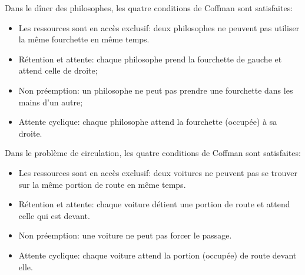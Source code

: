 \documentclass[a4paper,11pt]{article}
\begin{document}
\begin{Form}
\noindent Dans le dîner des philosophes, les quatre conditions de Coffman sont satisfaites:
\begin{itemize}
\item Les ressources sont en accès exclusif: deux philosophes ne peuvent pas utiliser la même fourchette en même temps.
\item Rétention et attente: chaque philosophe prend la fourchette de gauche et attend celle de droite;
\item Non préemption: un philosophe ne peut pas prendre une fourchette dans les mains d'un autre;
\item Attente cyclique: chaque philosophe attend la fourchette (occupée) à sa droite.
\end{itemize}
\bigskip
Dans le problème de circulation, les quatre conditions de Coffman sont satisfaites:
\begin{itemize}
\item Les ressources sont en accès exclusif: deux voitures ne peuvent pas se trouver sur la même portion de route en même temps.
\item Rétention et attente: chaque voiture détient une portion de route  et attend celle qui est devant.
\item Non préemption: une voiture ne peut pas forcer le passage.
\item Attente cyclique: chaque voiture attend la portion (occupée) de route devant elle.
\end{itemize}
\end{Form}
\end{document}

